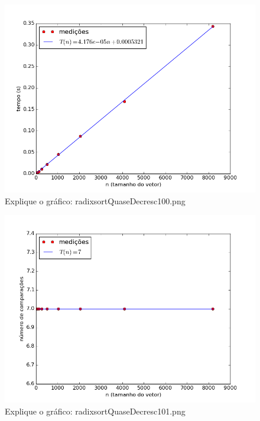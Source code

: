 \documentclass[12pt,a4paper,twoside]{report}
\begin{document}


\begin{figure}[ht]
\centering \includegraphics[scale=0.8]{../radixsort/imagens/radixsortQuaseDecresc100.png}
\caption{Explique o gráfico: radixsortQuaseDecresc100.png}
\label{fig:radixsortQuaseDecresc100}
\end{figure}

\begin{figure}[ht]
\centering \includegraphics[scale=0.8]{../radixsort/imagens/radixsortQuaseDecresc101.png}
\caption{Explique o gráfico: radixsortQuaseDecresc101.png}
\label{fig:radixsortQuaseDecresc101}
\end{figure}
\end{document}
